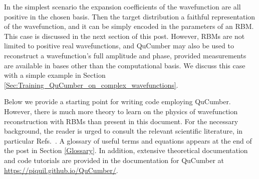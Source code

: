 \documentclass[submission, Phys]{SciPost}
\begin{document}



In the simplest scenario the expansion coefficients of the wavefunction are all positive in the chosen basis.
Then the target distribution a faithful representation of the wavefunction, and it can be simply encoded in the parameters of an RBM.
This case is discussed in the next section of this post. However, RBMs are not limited to positive real wavefunctions,
and QuCumber may also be used to reconstruct a wavefunction's full amplitude and phase, provided measurements are available in bases other than the computational basis.
We discuss this case with a simple example in Section \ref{Sec:Training_QuCumber_on_complex_wavefunctions}.

Below we provide a starting point for writing code employing QuCumber.
However, there is much more theory to learn on the physics of wavefunction reconstruction with RBMs than present in this document.
For the necessary background, the reader is urged to consult the relevant scientific literature, in particular Refs.~\cite{Torlai2016thermo, torlai2018tomography}.
A glossary of useful terms and equations appears at the end of the post in Section \ref{Glossary}.
In addition, extensive theoretical documentation and code tutorials are provided in the documentation for QuCumber at \url{https://piquil.github.io/QuCumber/}.
\end{document}
